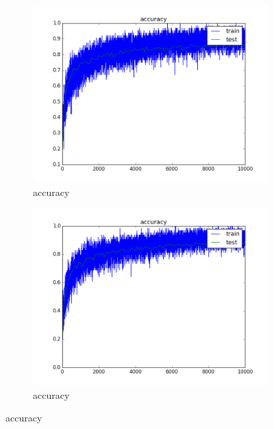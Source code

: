\documentclass{article}
\begin{document}
\begin{enumerate}
\begin{enumerate}
\begin{item}
		\end{item}
		
		
		
		\begin{item}
		\begin{figure}
		\centering
			\begin{subfigure}[b]{0.45\textwidth}
				\includegraphics[width=\textwidth]{figures/accuracy_64kernels}
				\caption{accuracy}
				\label{fig:64kern}
			\end{subfigure}	
			\quad
			\begin{subfigure}[b]{0.45\textwidth}
				\includegraphics[width=\textwidth]{figures/accuracy_128kernels}
				\caption{accuracy}
				\label{fig:128kern}
			\end{subfigure}	

\end{figure}
\end{item}
\end{enumerate}
\end{enumerate}
\end{document}
